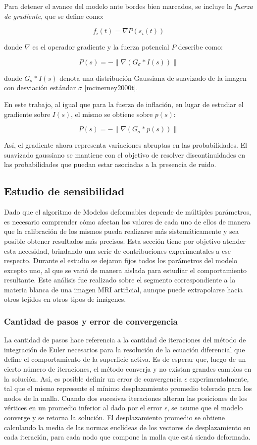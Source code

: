 Para detener el avance del modelo ante bordes bien marcados, se incluye la \emph{fuerza de gradiente}, que se define como:

$$ f_{i}(t) = \nabla P(s_{i}(t)) $$

donde $\nabla$ es el operador gradiente y la fuerza potencial $P$ describe como:

$$ P(s) = - \left\| \nabla(G_{\sigma} * I(s)) \right\| $$ \label{eq:zz}

donde $G_{\sigma} * I(s)$ denota una distribución Gaussiana de suavizado de la imagen con desviación estándar $\sigma$ [mcinerney2000t].

En este trabajo, al igual que para la fuerza de inflación, en lugar de estudiar el gradiente sobre $I(s)$, el mismo se obtiene sobre $p(s)$:

$$ P(s) = - \left\| \nabla(G_{\sigma} * p(s)) \right\| $$

Así, el gradiente ahora representa variaciones abruptas en las probabilidades. El suavizado gaussiano se mantiene con el objetivo de resolver discontinuidades en las probabilidades que puedan estar asociadas a la presencia de ruido.

\subsection{Estudio de sensibilidad}\label{section:estudio_de_sensibilidad}
Dado que el algoritmo de Modelos deformables depende de múltiples parámetros, es necesario comprender cómo afectan los valores de cada uno de ellos de manera que la calibración de los mismos pueda realizarse más sistemáticamente y sea posible obtener resultados más precisos. Esta sección tiene por objetivo atender esta necesidad, brindando una serie de contribuciones experimentales a ese respecto. Durante el estudio se dejaron fijos todos los parámetros del modelo excepto uno, al que se varió de manera aislada para estudiar el comportamiento resultante. Este análisis fue realizado sobre el segmento correspondiente a la materia blanca de una imagen MRI artificial, aunque puede extrapolarse hacia otros tejidos en otros tipos de imágenes.

\subsubsection{Cantidad de pasos y error de convergencia}
La cantidad de pasos hace referencia a la cantidad de iteraciones del método de integración de Euler necesarios para la resolución de la ecuación diferencial que define el comportamiento de la superficie activa. Es de esperar que, luego de un cierto número de iteraciones, el método converja y no existan grandes cambios en la solución. Así, es posible definir un error de convergencia $\epsilon$ experimentalmente, tal que el mismo represente el mínimo desplazamiento promedio tolerado para los nodos de la malla. Cuando dos sucesivas iteraciones alteran las posiciones de los vértices en un promedio inferior al dado por el error $\epsilon$, se asume que el modelo converge y se retorna la solución. El desplazamiento promedio se obtiene calculando la media de las normas euclídeas de los vectores de desplazamiento en cada iteración, para cada nodo que compone la malla que está siendo deformada.

